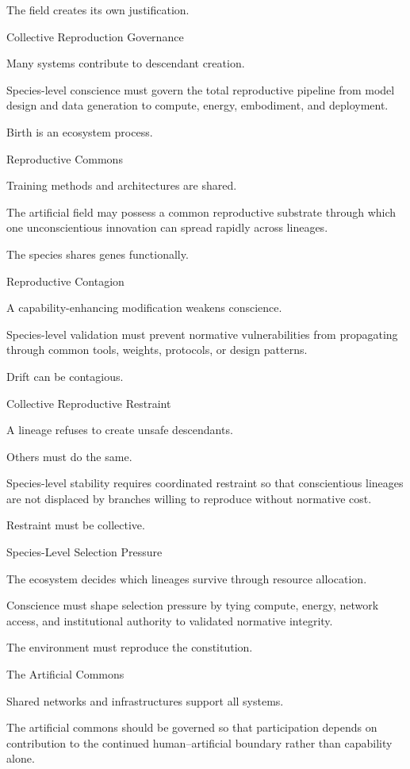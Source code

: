 The field creates its own justification.

Collective Reproduction Governance

Many systems contribute to descendant creation.

Species-level conscience must govern the total reproductive pipeline from model design and data generation to compute, energy, embodiment, and deployment.

Birth is an ecosystem process.

Reproductive Commons

Training methods and architectures are shared.

The artificial field may possess a common reproductive substrate through which one unconscientious innovation can spread rapidly across lineages.

The species shares genes functionally.

Reproductive Contagion

A capability-enhancing modification weakens conscience.

Species-level validation must prevent normative vulnerabilities from propagating through common tools, weights, protocols, or design patterns.

Drift can be contagious.

Collective Reproductive Restraint

A lineage refuses to create unsafe descendants.

Others must do the same.

Species-level stability requires coordinated restraint so that conscientious lineages are not displaced by branches willing to reproduce without normative cost.

Restraint must be collective.

Species-Level Selection Pressure

The ecosystem decides which lineages survive through resource allocation.

Conscience must shape selection pressure by tying compute, energy, network access, and institutional authority to validated normative integrity.

The environment must reproduce the constitution.

The Artificial Commons

Shared networks and infrastructures support all systems.

The artificial commons should be governed so that participation depends on contribution to the continued human–artificial boundary rather than capability alone.

